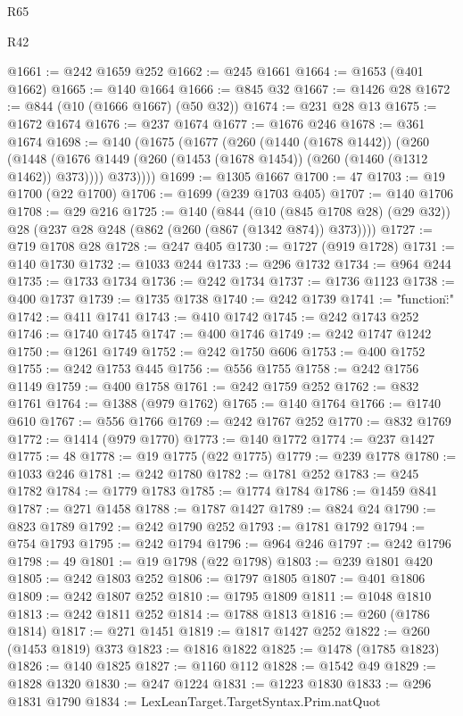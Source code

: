 \begin{lexlean}{R65}
\begin{lexlean}{R42}
\begin{coremodule}
{{{{{{{{{{{{{{{{{{{{{{{{{{{{{{{{{{{{{{{{{{{{{{{{{{{{{{{{{{{{{{{{{{{{{{{{{{{{{{{{{{{{{{{{{{{{{{{{{{{{{{{{{{{{{{{{{{{{{{{{{{{{{{{{{{{{{{{{{{{{{{{{{{{{{{{{{{{{{{{{{{{{{{{{{{{{{{{{{{{{{{{@1661 := @242 @1659 @252
@1662 := @245 @1661
@1664 := @1653 (@401 @1662)
@1665 := @140 @1664
@1666 := @845 @32
@1667 := @1426 @28
@1672 := @844 (@10 (@1666 @1667) (@50 @32))
@1674 := @231 @28 @13
@1675 := @1672 @1674
@1676 := @237 @1674
@1677 := @1676 @246
@1678 := @361 @1674
@1698 := @140
    (@1675
      (@1677
        (@260
          (@1440 (@1678 @1442))
          (@260
            (@1448 (@1676 @1449 (@260 (@1453 (@1678 @1454)) (@260 (@1460 (@1312 @1462)) @373))))
            @373))))
@1699 := @1305 @1667
@1700 := 47
@1703 := @19 @1700 (@22 @1700)
@1706 := @1699 (@239 @1703 @405)
@1707 := @140 @1706
@1708 := @29 @216
@1725 := @140
    (@844
      (@10 (@845 @1708 @28) (@29 @32))
      @28
      (@237 @28 @248 (@862 (@260 (@867 (@1342 @874)) @373))))
@1727 := @719 @1708 @28
@1728 := @247 @405
@1730 := @1727 (@919 @1728)
@1731 := @140 @1730
@1732 := @1033 @244
@1733 := @296 @1732
@1734 := @964 @244
@1735 := @1733 @1734
@1736 := @242 @1734
@1737 := @1736 @1123
@1738 := @400 @1737
@1739 := @1735 @1738
@1740 := @242 @1739
@1741 := "{\"function\":"
@1742 := @411 @1741
@1743 := @410 @1742
@1745 := @242 @1743 @252
@1746 := @1740 @1745
@1747 := @400 @1746
@1749 := @242 @1747 @1242
@1750 := @1261 @1749
@1752 := @242 @1750 @606
@1753 := @400 @1752
@1755 := @242 @1753 @445
@1756 := @556 @1755
@1758 := @242 @1756 @1149
@1759 := @400 @1758
@1761 := @242 @1759 @252
@1762 := @832 @1761
@1764 := @1388 (@979 @1762)
@1765 := @140 @1764
@1766 := @1740 @610
@1767 := @556 @1766
@1769 := @242 @1767 @252
@1770 := @832 @1769
@1772 := @1414 (@979 @1770)
@1773 := @140 @1772
@1774 := @237 @1427
@1775 := 48
@1778 := @19 @1775 (@22 @1775)
@1779 := @239 @1778
@1780 := @1033 @246
@1781 := @242 @1780
@1782 := @1781 @252
@1783 := @245 @1782
@1784 := @1779 @1783
@1785 := @1774 @1784
@1786 := @1459 @841
@1787 := @271 @1458
@1788 := @1787 @1427
@1789 := @824 @24
@1790 := @823 @1789
@1792 := @242 @1790 @252
@1793 := @1781 @1792
@1794 := @754 @1793
@1795 := @242 @1794
@1796 := @964 @246
@1797 := @242 @1796
@1798 := 49
@1801 := @19 @1798 (@22 @1798)
@1803 := @239 @1801 @420
@1805 := @242 @1803 @252
@1806 := @1797 @1805
@1807 := @401 @1806
@1809 := @242 @1807 @252
@1810 := @1795 @1809
@1811 := @1048 @1810
@1813 := @242 @1811 @252
@1814 := @1788 @1813
@1816 := @260 (@1786 @1814)
@1817 := @271 @1451
@1819 := @1817 @1427 @252
@1822 := @260 (@1453 @1819) @373
@1823 := @1816 @1822
@1825 := @1478 (@1785 @1823)
@1826 := @140 @1825
@1827 := @1160 @112
@1828 := @1542 @49
@1829 := @1828 @1320
@1830 := @247 @1224
@1831 := @1223 @1830
@1833 := @296 @1831 @1790
@1834 := LexLeanTarget.TargetSyntax.Prim.natQuot
}}}}}}}}}}}}}}}}}}}}}}}}}}}}}}}}}}}}}}}}}}}}}}}}}}}}}}}}}}}}}}}}}}}}}}}}}}}}}}}}}}}}}}}}}}}}}}}}}}}}}}}}}}}}}}}}}}}}}}}}}}}}}}}}}}}}}}}}}}}}}}}}}}}}}}}}}}}}}}}}}}}}}}}}}}}}}}}}}}}}}}}}
\end{coremodule}
\end{lexlean}
\end{lexlean}
